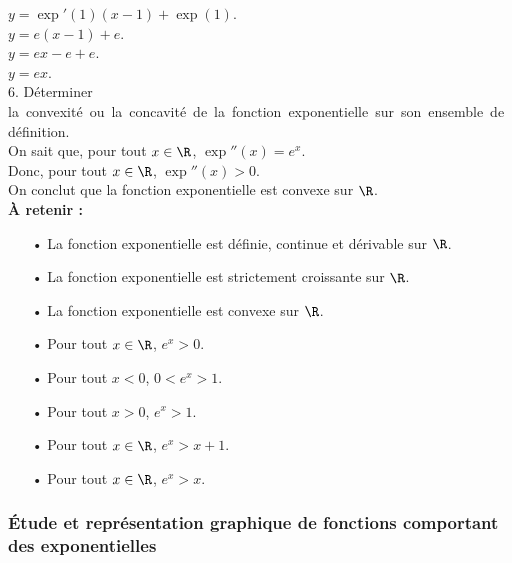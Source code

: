 $y = \exp'(1)\left(x-1\right) + \exp\left(1\right)$. \\
$y = e\left(x-1\right) + e$. \\
$y = ex - e + e$. \\
$y = ex$. \\

6. Déterminer \hbox{la convexité ou la concavité de la fonction exponentielle sur son ensemble de définition.} \\

On sait que, pour tout $x \in \R$, $\exp''(x) = e^x$. \\

Donc, pour tout $x \in \R$, $\exp''(x) > 0$. \\

On conclut que la fonction exponentielle est convexe sur $\R$. \\

\textbf{À retenir :} \\

\begin{itemize}
\item[•] La fonction exponentielle est définie, continue et dérivable sur $\R$. \\
\item[•] La fonction exponentielle est strictement croissante sur $\R$. \\
\item[•] La fonction exponentielle est convexe sur $\R$. \\
\item[•] Pour tout $x \in \R$, $e^x > 0$. \\
\item[•] Pour tout $x < 0$, $0 < e^x > 1$. \\
\item[•] Pour tout $x > 0$, $e^x > 1$. \\
\item[•] Pour tout $x \in \R$, $e^x > x+1$. \\ 
\item[•] Pour tout $x \in \R$, $e^x > x$. 
\end{itemize}

\newpage

\vspace*{-2cm}

\subsubsection{Étude et représentation graphique de fonctions comportant des exponentielles}

